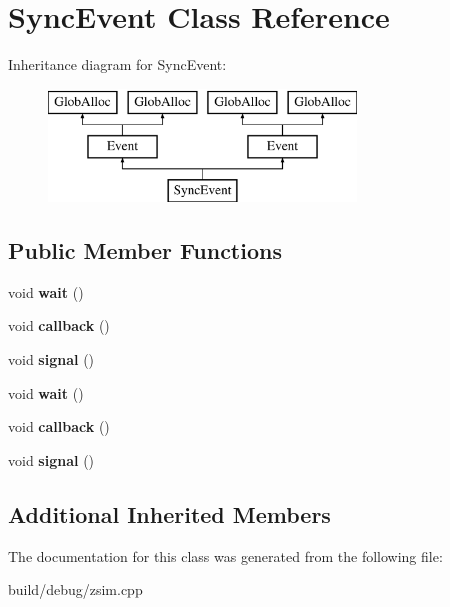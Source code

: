 \hypertarget{classSyncEvent}{\section{Sync\-Event Class Reference}
\label{classSyncEvent}
}
Inheritance diagram for Sync\-Event\-:\begin{figure}[H]
\begin{center}
\leavevmode
\includegraphics[height=3.000000cm]{classSyncEvent}
\end{center}
\end{figure}
\subsection*{Public Member Functions}
\begin{DoxyCompactItemize}
\item 
\hypertarget{classSyncEvent_a296ea2eca64006ab953c3298aae9ccdc}{void {\bfseries wait} ()}\label{classSyncEvent_a296ea2eca64006ab953c3298aae9ccdc}

\item 
\hypertarget{classSyncEvent_a262255519b2c2f076393d47dd2ef7a1f}{void {\bfseries callback} ()}\label{classSyncEvent_a262255519b2c2f076393d47dd2ef7a1f}

\item 
\hypertarget{classSyncEvent_aeef7bb7a4b588464897c10cadd6036ef}{void {\bfseries signal} ()}\label{classSyncEvent_aeef7bb7a4b588464897c10cadd6036ef}

\item 
\hypertarget{classSyncEvent_a296ea2eca64006ab953c3298aae9ccdc}{void {\bfseries wait} ()}\label{classSyncEvent_a296ea2eca64006ab953c3298aae9ccdc}

\item 
\hypertarget{classSyncEvent_a262255519b2c2f076393d47dd2ef7a1f}{void {\bfseries callback} ()}\label{classSyncEvent_a262255519b2c2f076393d47dd2ef7a1f}

\item 
\hypertarget{classSyncEvent_aeef7bb7a4b588464897c10cadd6036ef}{void {\bfseries signal} ()}\label{classSyncEvent_aeef7bb7a4b588464897c10cadd6036ef}

\end{DoxyCompactItemize}
\subsection*{Additional Inherited Members}


The documentation for this class was generated from the following file\-:\begin{DoxyCompactItemize}
\item 
build/debug/zsim.\-cpp\end{DoxyCompactItemize}
